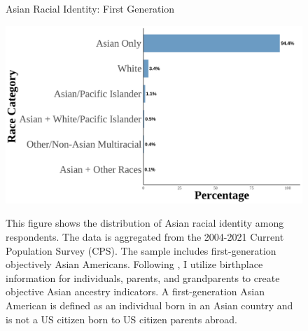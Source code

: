 \newpage
\pagebreak

\begin{center}
\begin{figure}[H]
\caption{Asian Racial Identity: First Generation}
\includegraphics[width=\textwidth]{histogram_asian_american_race_firstgen.png} 
\label{fig:histogram-firstgen}
\caption*{\footnotesize{This figure shows the distribution of Asian racial identity among respondents. 
The data is aggregated from the 2004-2021 Current Population Survey (CPS). 
The sample includes first-generation objectively Asian Americans.
Following \textcite{antmanEthnicAttritionObserved2016,antmanEthnicAttritionAssimilation2020}, 
I utilize birthplace information for individuals, parents, and grandparents to create objective Asian ancestry indicators.
A first-generation Asian American is defined as an individual born in an Asian country and is not a US citizen born to US citizen parents abroad.
}}
\end{figure}
\end{center}


\pagebreak
\newpage

